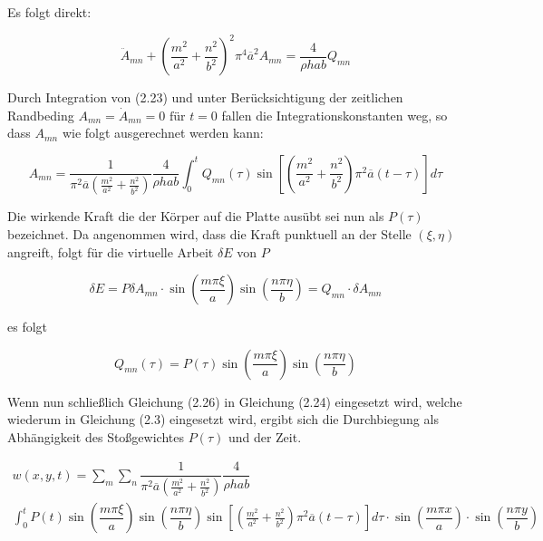 Es folgt direkt:

\begin{equation}
\ddot{A}_{mn} + \left(\dfrac{m^2}{a^2} + \dfrac{n^2}{b^2}\right)^2 \pi^4 \overline{a}^2 A_{mn} = \dfrac{4}{\rho h a b} Q_{mn}
\end{equation}


Durch Integration von (2.23) und unter Berücksichtigung der zeitlichen Randbeding $A_{mn} = \dot{A}_{mn} = 0 \text{ für } t = 0$ fallen die Integrationskonstanten weg, so dass $A_{mn}$ wie folgt ausgerechnet werden kann:

\begin{equation}
A_{mn} = \dfrac{1}{\pi^2 \overline{a}  \left(\frac{m^2}{a^2} + \frac{n^2}{b^2} \right)} \dfrac{4}{\rho h a b} \int_0^t	Q_{mn}(\tau) \sin \left[ \left(\frac{m^2}{a^2} + \frac{n^2}{b^2} \right) \pi^2 \overline{a} (t-\tau)\right] d\tau
\end{equation}


Die wirkende Kraft die der Körper auf die Platte ausübt sei nun als $P(\tau)$ bezeichnet. 
Da angenommen wird, dass die Kraft punktuell an der Stelle $(\xi, \eta)$ angreift, folgt für die virtuelle Arbeit $\delta E$ von $P$

\begin{equation}
\delta E = P \delta A_{mn} \cdot \sin \left( \dfrac{m \pi \xi}{a} \right) \sin \left( \dfrac{n \pi \eta}{b} \right) = Q_{mn} \cdot \delta A_{mn}
\end{equation} 

es folgt

\begin{equation}
Q_{mn}(\tau) = P(\tau) \sin \left( \dfrac{m \pi \xi}{a} \right) \sin \left( \dfrac{n \pi \eta}{b} \right)
\end{equation}



Wenn nun schließlich Gleichung (2.26) in Gleichung (2.24) eingesetzt wird, welche wiederum in Gleichung (2.3) eingesetzt wird, ergibt sich die Durchbiegung als Abhängigkeit des Stoßgewichtes $P(\tau)$ und der Zeit.

\begin{multline}
w(x,y,t) = \sum_m \sum_n 
\dfrac{1}{\pi^2 \overline{a}  \left(\frac{m^2}{a^2} + \frac{n^2}{b^2} \right)} \dfrac{4}{\rho h a b} \\ \int_0^t
 P(t) \sin \left( \dfrac{m \pi \xi}{a} \right) \sin \left( \dfrac{n \pi \eta}{b} \right)
\sin \left[ \left(\frac{m^2}{a^2} + \frac{n^2}{b^2} \right) \pi^2 \overline{a} (t-\tau)\right] d\tau
\cdot \sin\left(\dfrac{m \pi x}{a}\right) \cdot \sin\left(\dfrac{n \pi y}{b}\right)
\end{multline}

